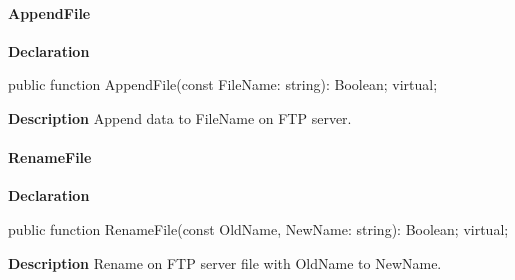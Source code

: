 \documentclass{report}
\newif\ifpdf
\begin{document}
\paragraph*{AppendFile}\hspace*{\fill}

\label{ftpsend.TFTPSend-AppendFile}
\begin{list}{}{
\setlength{\itemindent}{0cm}
\setlength{\listparindent}{0cm}
\setlength{\leftmargin}{\evensidemargin}
\addtolength{\leftmargin}{\tmplength}
\settowidth{\labelsep}{X}
\addtolength{\leftmargin}{\labelsep}
\setlength{\labelwidth}{\tmplength}
}
\item[\textbf{Declaration}\hfill]
\ifpdf
\begin{flushleft}
\fi
\begin{ttfamily}
public function AppendFile(const FileName: string): Boolean; virtual;\end{ttfamily}

\ifpdf
\end{flushleft}
\fi

\par
\item[\textbf{Description}]
Append data to FileName on FTP server.

\end{list}
\paragraph*{RenameFile}\hspace*{\fill}

\label{ftpsend.TFTPSend-RenameFile}
\begin{list}{}{
\setlength{\itemindent}{0cm}
\setlength{\listparindent}{0cm}
\setlength{\leftmargin}{\evensidemargin}
\addtolength{\leftmargin}{\tmplength}
\settowidth{\labelsep}{X}
\addtolength{\leftmargin}{\labelsep}
\setlength{\labelwidth}{\tmplength}
}
\item[\textbf{Declaration}\hfill]
\ifpdf
\begin{flushleft}
\fi
\begin{ttfamily}
public function RenameFile(const OldName, NewName: string): Boolean; virtual;\end{ttfamily}

\ifpdf
\end{flushleft}
\fi

\par
\item[\textbf{Description}]
Rename on FTP server file with OldName to NewName.

\end{list}
\end{document}
